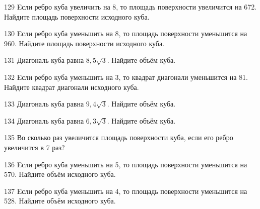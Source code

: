 \begin{taskBN}{129}
Eсли ребро куба увеличить на 8, то площадь поверхности увеличится на 672. Найдите площадь поверхности исходного куба.
\end{taskBN}

\begin{taskBN}{130}
Eсли ребро куба уменьшить на 8, то площадь поверхности уменьшится на 960. Найдите площадь поверхности исходного куба.
\end{taskBN}

\begin{taskBN}{131}
Диагональ куба равна $8,5\sqrt{3}$. Найдите объём куба.
\end{taskBN}

\begin{taskBN}{132}
Eсли ребро куба уменьшить на 3, то квадрат диагонали уменьшится на 81. Найдите квадрат диагонали исходного куба.
\end{taskBN}

\begin{taskBN}{133}
Диагональ куба равна $9,4\sqrt{3}$. Найдите объём куба.
\end{taskBN}

\begin{taskBN}{134}
Диагональ куба равна $6,3\sqrt{3}$. Найдите объём куба.
\end{taskBN}

\begin{taskBN}{135}
Во сколько раз увеличится площадь поверхности куба, если его ребро увеличится в 7 раз?
\end{taskBN}

\begin{taskBN}{136}
Eсли ребро куба уменьшить на 5, то площадь поверхности уменьшится на 570. Найдите объём исходного куба.
\end{taskBN}

\begin{taskBN}{137}
Eсли ребро куба уменьшить на 4, то площадь поверхности уменьшится на 528. Найдите объём исходного куба.
\end{taskBN}

